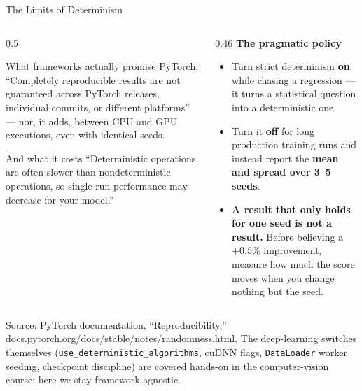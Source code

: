 \begin{frame}{The Limits of Determinism}

    \begin{columns}[T]
        \begin{column}{0.5\textwidth}
            \begin{alertblock}{What frameworks actually promise}
                \small PyTorch: ``Completely reproducible results are not guaranteed across PyTorch
                releases, individual commits, or different platforms'' --- nor, it adds, between CPU and
                GPU executions, even with identical seeds.
            \end{alertblock}
            \vspace{0.4em}
            \begin{block}{And what it costs}
                \small ``Deterministic operations are often slower than nondeterministic operations, so
                single-run performance may decrease for your model.''
            \end{block}
        \end{column}
        \begin{column}{0.46\textwidth}
            \small
            \textbf{The pragmatic policy}
            \begin{itemize}
                \item Turn strict determinism \textbf{on} while chasing a regression --- it turns a
                      statistical question into a deterministic one.
                \item Turn it \textbf{off} for long production training runs and instead report the
                      \textbf{mean and spread over 3--5 seeds}.
                \item \textbf{A result that only holds for one seed is not a result.} Before believing a
                      $+0.5\%$ improvement, measure how much the score moves when you change nothing but
                      the seed.
            \end{itemize}
        \end{column}
    \end{columns}

    \vspace{0.6em}
    {\scriptsize Source: PyTorch documentation, ``Reproducibility,''
    \href{https://docs.pytorch.org/docs/stable/notes/randomness.html}{docs.pytorch.org/docs/stable/notes/randomness.html}.
    The deep-learning switches themselves (\texttt{use\_deterministic\_algorithms}, cuDNN flags,
    \texttt{DataLoader} worker seeding, checkpoint discipline) are covered hands-on in the
    computer-vision course; here we stay framework-agnostic.}

\end{frame}

